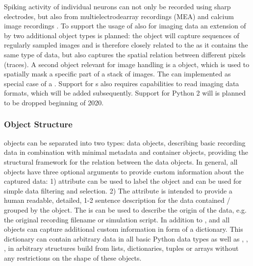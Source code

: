 Spiking activity of individual neurons can not only be recorded using sharp electrodes, but also  from multielectrodearray recordings (MEA) and calcium image recordings \citep{Kelly_2007, Shew_2010}. To support the usage of  also for imaging data an extension of  by two additional object types is planned: the  object will capture sequences of regularly sampled images and is therefore closely related to the  as it contains the same type of data, but also captures the spatial relation between different pixels (traces). A second object relevant for image handling is a  object, which is used to spatially mask a specific part of a stack of images. The  can implemented as special case of a . Support for s also requires capabilities to read imaging data formats, which will be added subsequently.
Support for Python 2 will is planned to be dropped beginning of 2020.


\subsubsection{ Object Structure}
 objects can be separated into two types: data objects, describing basic recording data in combination with minimal metadata and container objects, providing the structural framework for the relation between the data objects. In general, all  objects have three optional arguments to provide custom information about the captured data: 1)  attribute can be used to label the object and can be used for simple data filtering and selection. 2) The  attribute is intended to provide a human readable, detailed, 1-2 sentence description for the data contained / grouped by the  object. The  is can be used to describe the origin of the data, e.g. the original recording filename or simulation script. In addition to ,  and  all  objects can capture additional custom information in form of a  dictionary. This dictionary can contain arbitrary data in all basic Python data types as well as , , ,  in arbitrary structures build from lists, dictionaries, tuples or  arrays without any restrictions on the shape of these objects.


